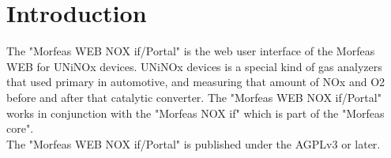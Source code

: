 \section{Introduction}
The "Morfeas WEB NOX if/Portal" is the web user interface of the Morfeas WEB for UNiNOx devices.
UNiNOx devices is a special kind of gas analyzers that used primary in automotive, 
and measuring that amount of NOx and O2 before and after that catalytic converter.
The "Morfeas WEB NOX if/Portal" works in conjunction with the "Morfeas NOX if" which is part of the "Morfeas core".\\

The "Morfeas WEB NOX if/Portal" is published under the AGPLv3 or later.